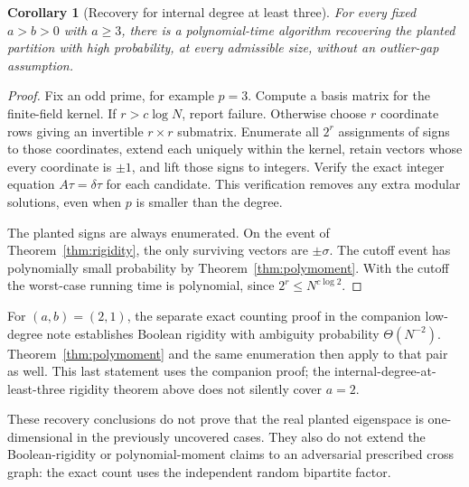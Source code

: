 \documentclass[11pt]{article}
\newtheorem{corollary}{Corollary}
\begin{document}
\begin{corollary}[Recovery for internal degree at least three]
For every fixed $a>b>0$ with $a\ge3$, there is a polynomial-time algorithm recovering the planted partition with high probability, at every admissible size, without an outlier-gap assumption.
\end{corollary}
\begin{proof}
Fix an odd prime, for example $p=3$. Compute a basis matrix for the finite-field kernel. If $r>c\log N$, report failure. Otherwise choose $r$ coordinate rows giving an invertible $r\times r$ submatrix. Enumerate all $2^r$ assignments of signs to those coordinates, extend each uniquely within the kernel, retain vectors whose every coordinate is $\pm1$, and lift those signs to integers. Verify the exact integer equation $A\tau=\delta\tau$ for each candidate. This verification removes any extra modular solutions, even when $p$ is smaller than the degree.

The planted signs are always enumerated. On the event of Theorem~\ref{thm:rigidity}, the only surviving vectors are $\pm\sigma$. The cutoff event has polynomially small probability by Theorem~\ref{thm:polymoment}. With the cutoff the worst-case running time is polynomial, since $2^r\le N^{c\log2}$.
\end{proof}

For $(a,b)=(2,1)$, the separate exact counting proof in the companion low-degree note establishes Boolean rigidity with ambiguity probability $\Theta(N^{-2})$. Theorem~\ref{thm:polymoment} and the same enumeration then apply to that pair as well. This last statement uses the companion proof; the internal-degree-at-least-three rigidity theorem above does not silently cover $a=2$.

These recovery conclusions do not prove that the real planted eigenspace is one-dimensional in the previously uncovered cases. They also do not extend the Boolean-rigidity or polynomial-moment claims to an adversarial prescribed cross graph: the exact count uses the independent random bipartite factor.
\end{document}
